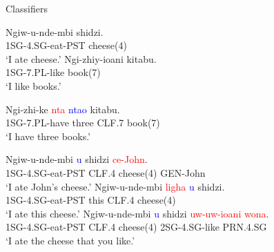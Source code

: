 \documentclass{beamer}
\newcommand{\exsc}[1]{{\tiny\MakeUppercase{#1}}}
\begin{document}
\begin{frame}{Classifiers}

{\scriptsize
\begin{exe}
\sn
\gll Ngiw-u-nde-mbi shidzi. \\
\exsc{1sg}-\exsc{4.sg}-eat-\exsc{pst} cheese(4) \\
\trans `I ate cheese.'
\sn
\gll Ngi-zhiy-ioani kitabu. \\
\exsc{1sg}-\exsc{7.pl}-like book(7) \\
\trans `I like books.'
\end{exe}
}
\pause
{\scriptsize
\begin{exe}
\sn
\gll Ngi-zhi-ke \textcolor{red}{nta} \textcolor{blue}{nta\textbeltl o} kitabu. \\
\exsc{1sg}-\exsc{7.pl}-have three \exsc{clf.7} book(7) \\
\trans `I have three books.'
\end{exe}
}
\pause
{\scriptsize
\begin{exe}
\sn
\gll Ngiw-u-nde-mbi \textcolor{blue}{u} shidzi \textcolor{red}{ce-John}. \\
\exsc{1sg}-\exsc{4.sg}-eat-\exsc{pst} \exsc{clf.4} cheese(4) \exsc{gen}-John \\
\trans `I ate John's cheese.'
\sn
\gll Ngiw-u-nde-mbi \textcolor{red}{ligha} \textcolor{blue}{u} shidzi. \\
\exsc{1sg}-\exsc{4.sg}-eat-\exsc{pst} this \exsc{clf.4} cheese(4) \\
\trans `I ate this cheese.'
\sn
\gll Ngiw-u-nde-mbi \textcolor{blue}{u} shidzi \textcolor{red}{uw-uw-ioani} \textcolor{red}{wona}. \\
\exsc{1sg}-\exsc{4.sg}-eat-\exsc{pst} \exsc{clf.4} cheese(4) \exsc{2sg}-\exsc{4.sg}-like \exsc{prn.4.sg} \\
\trans `I ate the cheese that you like.'
\end{exe}
}
\end{frame}
\end{document}
